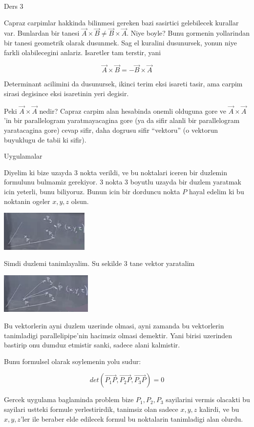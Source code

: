 \documentclass[12pt,fleqn]{article}\usepackage{../common}
\begin{document}
Ders 3

Capraz carpimlar hakkinda bilinmesi gereken bazi sasirtici gelebilecek
kurallar var. Bunlardan bir tanesi $\vec{A} \times \vec{B} \ne \vec{B}
\times \vec{A}$. Niye boyle? Bunu 
gormenin yollarindan bir tanesi geometrik olarak dusunmek. Sag el kuralini
dusunursek, yonun niye farkli olabilecegini anlariz. Isaretler tam terstir, yani

\[  \vec{A} \times \vec{B} = - \vec{B}\times \vec{A} \]

Determinant acilimini da dusunursek, ikinci terim eksi isareti tasir, ama
carpim sirasi degisince eksi isaretinin yeri degisir. 

Peki $\vec{A} \times \vec{A}$ nedir? Capraz carpim alan hesabinda onemli
olduguna gore ve $\vec{A} \times \vec{A}$'in bir parallelogram
yaratmayacagina gore (ya da sifir alanli bir parallelogram yaratacagina
gore) cevap sifir, daha dogrusu sifir ``vektoru'' (o vektorun buyuklugu de
tabii ki sifir).

Uygulamalar

Diyelim ki bize uzayda 3 nokta verildi, ve bu noktalari iceren bir duzlemin
formulunu bulmamiz gerekiyor. 3 nokta 3 boyutlu uzayda bir duzlem yaratmak
icin yeterli, bunu biliyoruz. Bunun icin bir dorduncu nokta $P$ hayal
edelim ki bu noktanin ogeler $x,y,z$ olsun.

\includegraphics[height=2cm]{3_1.png}

Simdi duzlemi tanimlayalim. Su sekilde 3 tane vektor yaratalim

\includegraphics[height=2cm]{3_2.png}

Bu vektorlerin ayni duzlem uzerinde olmasi, ayni zamanda bu vektorlerin
tanimladigi parallelipipe'nin hacimsiz olmasi demektir. Yani birisi
uzerinden bastirip onu dumduz etmistir sanki, sadece alani kalmistir. 

Bunu formulsel olarak soylemenin yolu sudur:

\[ det(\vec{P_1P},\vec{P_2P},\vec{P_3P}) = 0 \]

Gercek uygulama baglaminda problem bize $P_1,P_2,P_3$ sayilarini vermis
olacakti bu sayilari ustteki formule yerlestirirdik, tanimsiz olan sadece
$x,y,z$ kalirdi, ve bu $x,y,z$'ler ile beraber elde edilecek formul bu
noktalarin tanimladigi alan olurdu.
\end{document}

